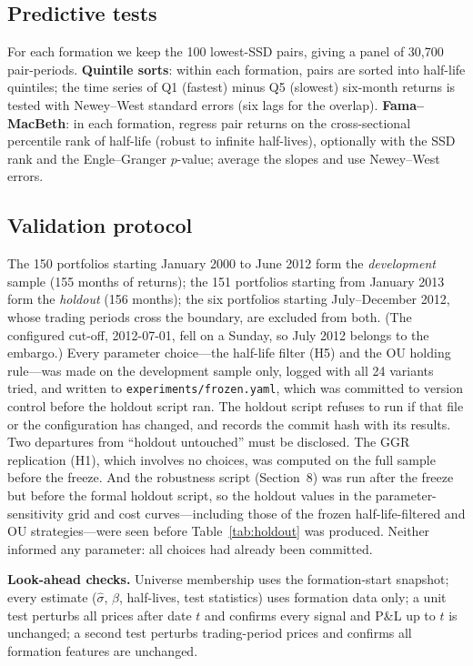 \documentclass[11pt]{article}
\begin{document}
\subsection{Predictive tests}
For each formation we keep the 100 lowest-SSD pairs, giving a panel of 30,700 pair-periods.
\textbf{Quintile sorts}: within each formation, pairs are sorted into half-life quintiles; the time series of Q1 (fastest) minus Q5 (slowest) six-month returns is tested with Newey--West standard errors (six lags for the overlap). \textbf{Fama--MacBeth}: in each formation, regress pair returns on the cross-sectional percentile rank of half-life (robust to infinite half-lives), optionally with the SSD rank and the Engle--Granger $p$-value; average the slopes and use Newey--West errors.

\subsection{Validation protocol}
The 150 portfolios starting January 2000 to June 2012 form the \emph{development} sample (155 months of returns); the 151 portfolios starting from January 2013 form the \emph{holdout} (156 months); the six portfolios starting July--December 2012, whose trading periods cross the boundary, are excluded from both. (The configured cut-off, 2012-07-01, fell on a Sunday, so July 2012 belongs to the embargo.) Every parameter choice---the half-life filter (H5) and the OU holding rule---was made on the development sample only, logged with all 24 variants tried, and written to \texttt{experiments/frozen.yaml}, which was committed to version control before the holdout script ran. The holdout script refuses to run if that file or the configuration has changed, and records the commit hash with its results. Two departures from ``holdout untouched'' must be disclosed. The GGR replication (H1), which involves no choices, was computed on the full sample before the freeze. And the robustness script (Section~8) was run after the freeze but before the formal holdout script, so the holdout values in the parameter-sensitivity grid and cost curves---including those of the frozen half-life-filtered and OU strategies---were seen before Table~\ref{tab:holdout} was produced. Neither informed any parameter: all choices had already been committed.

\textbf{Look-ahead checks.} Universe membership uses the formation-start snapshot; every estimate ($\hat\sigma$, $\beta$, half-lives, test statistics) uses formation data only; a unit test perturbs all prices after date $t$ and confirms every signal and P\&L up to $t$ is unchanged; a second test perturbs trading-period prices and confirms all formation features are unchanged.
\end{document}

